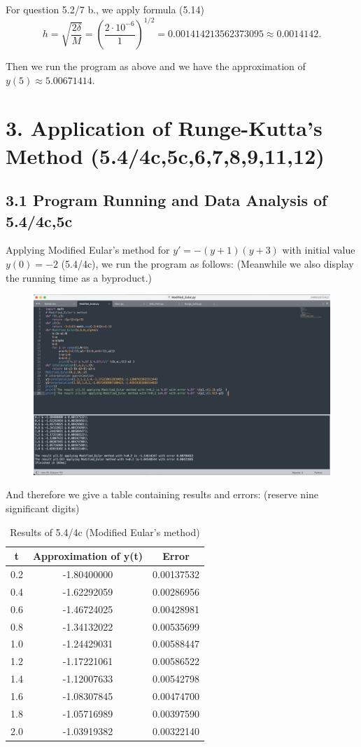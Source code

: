 \documentclass{article}
\begin{document}
    For question 5.2/7 b., we apply formula (5.14)
    $$ h=\sqrt{\frac{2\delta}{M}}=(\frac{2\cdot 10^{-6}}{1})^{1/2}=0.001414213562373095\approx0.0014142.
    $$

    Then we run the program as above and we have the approximation of $y(5)\approx 5.00671414.$

\section{3. Application of Runge-Kutta's Method (5.4/4c,5c,6,7,8,9,11,12)}
    \subsection{3.1 Program Running and Data Analysis of 5.4/4c,5c} 
    Applying Modified Eular's method for $y'=-(y+1)(y+3)$ with initial value $y(0)=-2$ (5.4/4c), we run the program as follows: (Meanwhile we also display the running time as a byproduct.)
    \begin{figure}[h]
    \centering
    \includegraphics[scale=0.25]{Program2}
    \end{figure}

    And therefore we give a table containing results and errors: (reserve nine significant digits)
    \begin{table}[htbp]
    \centering
    \caption{Results of 5.4/4c (Modified Eular's method)}
    \begin{tabular}{c|c|c}
    \toprule
    t& \textbf{Approximation of y(t)} & \textbf{Error} \\ 
    \midrule
    0.2 & -1.80400000 & 0.00137532\\
    0.4 & -1.62292059 & 0.00286956\\
    0.6 & -1.46724025 & 0.00428981\\
    0.8 & -1.34132022 & 0.00535699\\
    1.0 & -1.24429031 & 0.00588447\\
    1.2 & -1.17221061 & 0.00586522\\
    1.4 & -1.12007633 & 0.00542798\\
    1.6 & -1.08307845 & 0.00474700\\
    1.8 & -1.05716989 & 0.00397590\\
    2.0 & -1.03919382 & 0.00322140\\
    \bottomrule
    \end{tabular}
    \end{table}
\end{document}
